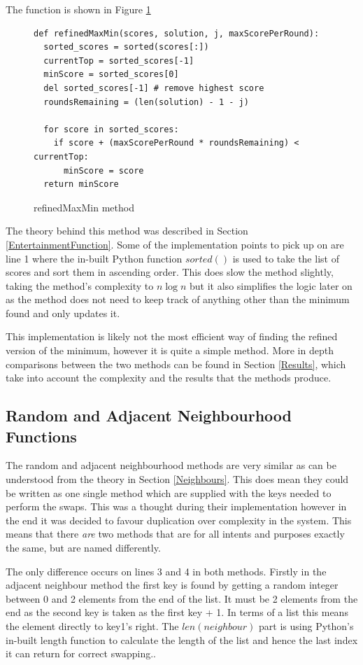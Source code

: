 \documentclass[12pt]{report}
\begin{document}
The function is shown in Figure \ref{refMaxMin}

\begin{figure}[H]
\caption{refinedMaxMin method}
\label{refMaxMin}
\begin{lstlisting}
def refinedMaxMin(scores, solution, j, maxScorePerRound):
  sorted_scores = sorted(scores[:])
  currentTop = sorted_scores[-1]
  minScore = sorted_scores[0]
  del sorted_scores[-1] # remove highest score
  roundsRemaining = (len(solution) - 1 - j)

  for score in sorted_scores:
    if score + (maxScorePerRound * roundsRemaining) < currentTop:
      minScore = score
  return minScore
\end{lstlisting}
\end{figure}

The theory behind this method was described in Section \ref{EntertainmentFunction}. Some of the implementation points to pick up on are line 1 where the in-built Python function $sorted()$\cite{PythonSorted} is used to take the list of scores and sort them in ascending order. This does slow the method slightly, taking the method's complexity to $n \log n$ but it also simplifies the logic later on as the method does not need to keep track of anything other than the minimum found and only updates it.

This implementation is likely not the most efficient way of finding the refined version of the minimum, however it is quite a simple method. More in depth comparisons between the two methods can be found in Section \ref{Results}, which take into account the complexity and the results that the methods produce.

\subsection{Random and Adjacent Neighbourhood Functions}\label{Imp-Neighbours}
The random and adjacent neighbourhood methods are very similar as can be understood from the theory in Section \ref{Neighbours}. This does mean they could be written as one single method which are supplied with the keys needed to perform the swaps. This was a thought during their implementation however in the end it was decided to favour duplication over complexity in the system. This means that there \textit{are} two methods that are for all intents and purposes exactly the same, but are named differently.

The only difference occurs on lines 3 and 4 in both methods. Firstly in the adjacent neighbour method the first key is found by getting a random integer between 0 and 2 elements from the end of the list. It must be 2 elements from the end as the second key is taken as the first key + 1. In terms of a list this means the element directly to key1's right. The $len(neighbour)$ part is using Python's in-built length function to calculate the length of the list and hence the last index it can return for correct swapping.\cite{PythonLen}.
\end{document}

